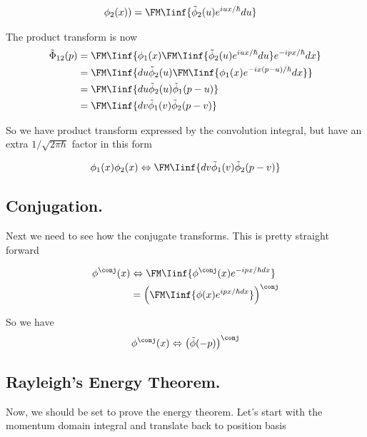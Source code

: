 \begin{align*}
\phi_2(x)) &= \FM \Iinf{\tilde{\phi}_2(u) e^{iux/\hbar} du}
\end{align*}

The product transform is now
\begin{align*}
\tilde{\Phi}_{12}(p) 
&= \FM \Iinf{ \phi_1(x)             \FM \Iinf{\tilde{\phi}_2(u) e^{iux/\hbar} du} e^{-ipx/\hbar} dx} \\
&= \FM \Iinf{ du \tilde{\phi}_2(u)  \FM \Iinf{ \phi_1(x) e^{-ix(p-u)/\hbar} dx } } \\
&= \FM \Iinf{ du \tilde{\phi}_2(u)  \tilde{\phi}_1(p-u) } \\
&= \FM \Iinf{ dv \tilde{\phi}_1(v)  \tilde{\phi}_2(p-v)}  \\
\end{align*}

So we have product transform expressed by the convolution integral, but have an extra $1/\sqrt{2\pi\hbar}$ factor in this form

\begin{align}
\phi_1(x) \phi_2(x) \Leftrightarrow \FM \Iinf{ dv \tilde{\phi}_1(v)  \tilde{\phi}_2(p-v) } \\
\end{align}

\subsection{Conjugation. }

Next we need to see how the conjugate transforms.  This is pretty straight forward

\begin{align*}
\phi^\conj(x) 
&\Leftrightarrow \FM \Iinf{ \phi^\conj(x) e^{-ipx/\hbar dx}} \\
&= \left(\FM \Iinf{ \phi(x) e^{ipx/\hbar dx}}\right)^\conj \\
\end{align*}

So we have
\begin{align*}
\phi^\conj(x) \Leftrightarrow \left(\tilde{\phi}(-p) \right)^\conj \\
\end{align*}

\subsection{Rayleigh's Energy Theorem. }

Now, we should be set to prove the energy theorem.  Let's start with the 
momentum domain integral and translate back to position basis

